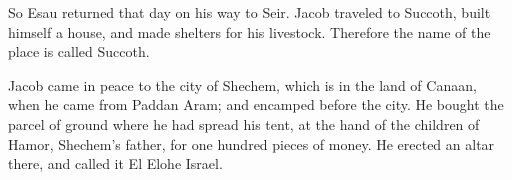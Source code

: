 {\par }{\PP {}So Esau returned that day on his way to Seir.
Jacob traveled to Succoth, built himself a house, and made shelters for his livestock. Therefore the name of the place is called Succoth.
\par }{\PP {}Jacob came in peace to the city of Shechem, which is in the land of Canaan, when he came from Paddan Aram; and encamped before the city.
He bought the parcel of ground where he had spread his tent, at the hand of the children of Hamor, Shechem’s father, for one hundred pieces of money.
He erected an altar there, and called it El Elohe Israel.

}
